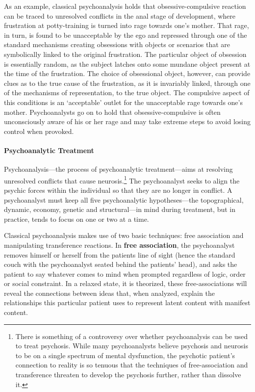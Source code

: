 \begin{refsection}
As an example, classical psychoanalysis holds that obsessive-compulsive reaction can be traced to unresolved conflicts in the anal stage of development, where frustration at potty-training is turned into rage towards one's mother. That rage, in turn, is found to be unacceptable by the ego and repressed through one of the standard mechanisms creating obsessions with objects or scenarios that are symbolically linked to the original frustration. The particular object of obsession is essentially random, as the subject latches onto some mundane object present at the time of the frustration. The choice of obsessional object, however, can provide clues as to the true cause of the frustration, as it is invariably linked, through one of the mechanisms of representation, to the true object. The compulsive aspect of this conditions is an `acceptable' outlet for the unacceptable rage towards one's mother. Psychoanalysts go on to hold that obsessive-compulsive is often unconsciously aware of his or her rage and may take extreme steps to avoid losing control when provoked. 

\paragraph{Psychoanalytic Treatment}
\label{psychoanalytictreatment}

Psychoanalysis---the process of psychoanalytic treatment---aims at resolving unresolved conflicts that cause neurosis.\footnote{There is something of a controversy over whether psychoanalysis can be used to treat psychosis. While many psychoanalysts believe psychosis and neurosis to be on a single spectrum of mental dysfunction, the psychotic patient's connection to reality is so tenuous that the techniques of free-association and transference threaten to develop the psychosis further, rather than dissolve it.} The psychoanalyst seeks to align the psychic forces within the individual so that they are no longer in conflict. A psychoanalyst must keep all five psychoanalytic hypotheses---the topographical, dynamic, economy, genetic and structural---in mind during treatment, but in practice, tends to focus on one or two at a time. 

Classical psychoanalysis makes use of two basic techniques: free association and manipulating transference reactions. In \textbf{free association}, the psychoanalyst removes himself or herself from the patients line of sight (hence the standard couch with the psychoanalyst seated behind the patients' head), and asks the patient to say whatever comes to mind when prompted regardless of logic, order or social constraint. In a relaxed state, it is theorized, these free-associations will reveal the connections between ideas that, when analyzed, explain the relationships this particular patient uses to represent latent content with manifest content.


\end{refsection}
